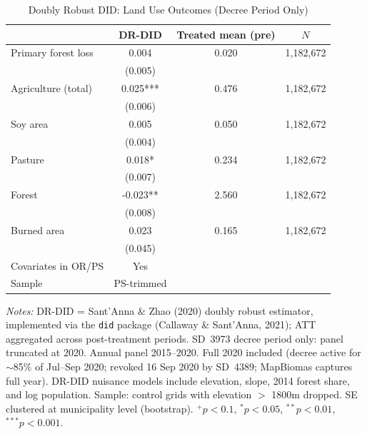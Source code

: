 \begin{table}[htbp]
\centering
\small
\caption{Doubly Robust DID: Land Use Outcomes (Decree Period Only)}
\label{tab:did_drdid_landuse_decree}
\begin{tabular}{lccc}
\toprule
 & DR-DID & Treated mean (pre) & $N$ \\
\midrule
Primary forest loss & 0.004 & 0.020 & 1,182,672 \\
 & (0.005) & & \\
[0.5em]
Agriculture (total) & 0.025*** & 0.476 & 1,182,672 \\
 & (0.006) & & \\
[0.5em]
Soy area & 0.005 & 0.050 & 1,182,672 \\
 & (0.004) & & \\
[0.5em]
Pasture & 0.018* & 0.234 & 1,182,672 \\
 & (0.007) & & \\
[0.5em]
Forest & -0.023** & 2.560 & 1,182,672 \\
 & (0.008) & & \\
[0.5em]
Burned area & 0.023 & 0.165 & 1,182,672 \\
 & (0.045) & & \\
\midrule
Covariates in OR/PS & Yes & & \\
Sample & PS-trimmed & & \\
\bottomrule
\end{tabular}
\begin{tablenotes}[flushleft]
\small
\item \textit{Notes:} DR-DID = Sant'Anna \& Zhao (2020) doubly robust estimator, implemented via the \texttt{did} package (Callaway \& Sant'Anna, 2021); ATT aggregated across post-treatment periods. SD~3973 decree period only: panel truncated at 2020. Annual panel 2015--2020. Full 2020 included (decree active for $\sim$85\% of Jul--Sep 2020; revoked 16 Sep 2020 by SD~4389; MapBiomas captures full year). DR-DID nuisance models include elevation, slope, 2014 forest share, and log population. Sample: control grids with elevation $>$ 1800m dropped. SE clustered at municipality level (bootstrap). $^{+}p<0.1$, $^{*}p<0.05$, $^{**}p<0.01$, $^{***}p<0.001$.
\end{tablenotes}
\end{table}
